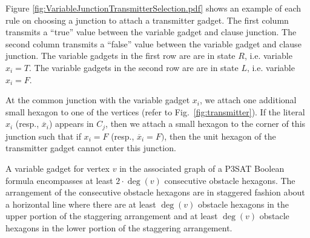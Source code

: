 Figure \ref{fig:VariableJunctionTransmitterSelection.pdf} shows an example of each rule on choosing a junction to attach a transmitter gadget.
The first column transmits a ``true'' value between the variable gadget and clause junction.
The second column transmits a ``false'' value between the variable gadget and clause junction.
The variable gadgets in the first row are are in state $R$, i.e. variable $x_i = T$.
The variable gadgets in the second row are are in state $L$, i.e. variable $x_i = F$.

At the common junction with the variable gadget $x_i$, we attach one additional small hexagon to one of the vertices (refer to Fig.~\ref{fig:transmitter}). 
If the literal $x_i$ (resp., $\overline{x}_i$) appears in $C_j$, then we attach a small hexagon to the corner of this junction such that if $x_i=F$ (resp., $\overline{x}_i=F)$, then the unit hexagon of the transmitter gadget cannot enter this junction. 

A variable gadget for vertex $v$ in the associated graph of a P3SAT Boolean formula encompasses at least $2 \cdot \deg (v)$ consecutive obstacle hexagons. 
The arrangement of the consecutive obstacle hexagons are in staggered fashion about a horizontal line where there are at least $\deg (v)$ obstacle hexagons in the upper portion of the staggering arrangement and at least $\deg (v)$ obstacle hexagons in the lower portion of the staggering arrangement.



